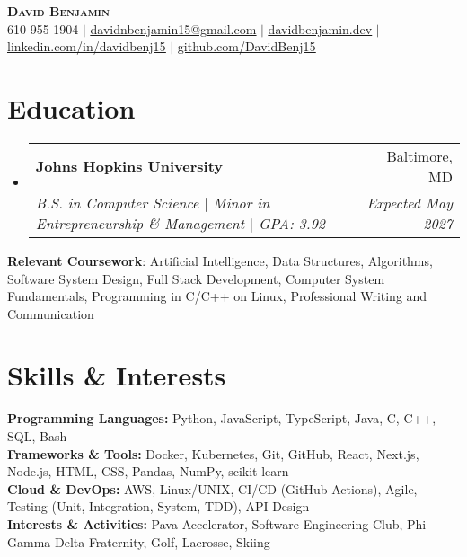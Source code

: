 \documentclass[letterpaper,10pt]{article}
\makeatletter
\newcommand{\resumeItem}[1]{
  \item\small{
    {#1 \vspace{-2pt}}
  }
}
\newcommand{\resumeSubheading}[4]{
  \vspace{-2pt}\item
    \begin{tabular*}{0.97\textwidth}[t]{l@{\extracolsep{\fill}}r}
      \textbf{#1} & #2 \\
      \textit{\small#3} & \textit{\small #4} \\
    \end{tabular*}\vspace{-7pt}
}
\newcommand{\resumeSubHeadingListStart}{\begin{itemize}[leftmargin=0.15in, label={}]}
\newcommand{\resumeSubHeadingListEnd}{\end{itemize}}
\newcommand{\resumeItemListStart}{\begin{itemize}}
\newcommand{\resumeItemListEnd}{\end{itemize}\vspace{-5pt}}
\makeatother
\begin{document}
\begin{center}
    \textbf{\Huge \scshape David Benjamin} \\ \vspace{1pt}
    \small 610-955-1904 $|$ \href{mailto:davidnbenjamin15@gmail.com}{\underline{davidnbenjamin15@gmail.com}} $|$ 
    \href{https://davidbenjamin.dev}{\underline{davidbenjamin.dev}} $|$
    \href{https://www.linkedin.com/in/davidbenj15/}{\underline{linkedin.com/in/davidbenj15}} $|$
    \href{https://github.com/DavidBenj15}{\underline{github.com/DavidBenj15}}
\end{center}

\section{Education}
  \resumeSubHeadingListStart
    \resumeSubheading
      {Johns Hopkins University}{Baltimore, MD}
      {B.S. in Computer Science $|$ Minor in Entrepreneurship \& Management $|$ GPA: 3.92}{Expected May 2027}
  \resumeSubHeadingListEnd


    \begin{itemize}[leftmargin=0.15in, label={}]
    \small{
        \item{
            \textbf{Relevant Coursework}: Artificial Intelligence, Data Structures, Algorithms, Software System Design, Full Stack Development, Computer System Fundamentals, Programming in C/C++ on Linux, Professional Writing and Communication
        }
    }
\end{itemize}

\section{Skills \& Interests}
\begin{itemize}[leftmargin=0.15in, label={}]
    \small{
        \item{
            \textbf{Programming Languages:} Python, JavaScript, TypeScript, Java, C, C++, SQL, Bash \\
            \textbf{Frameworks \& Tools:} Docker, Kubernetes, Git, GitHub, React, Next.js, Node.js, HTML, CSS, Pandas, NumPy, scikit-learn \\
            \textbf{Cloud \& DevOps:} AWS, Linux/UNIX, CI/CD (GitHub Actions), Agile, Testing (Unit, Integration, System, TDD), API Design \\
            \textbf{Interests \& Activities:} Pava Accelerator, Software Engineering Club, Phi Gamma Delta Fraternity, Golf, Lacrosse, Skiing
        }
    }
\end{itemize}
\end{document}
